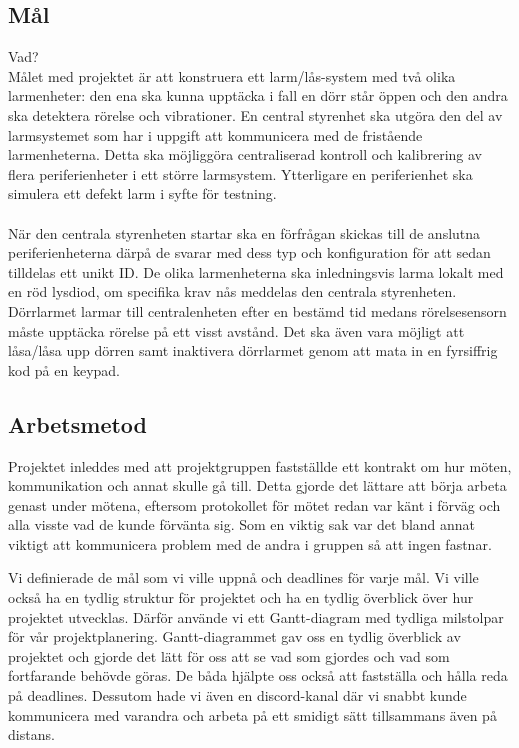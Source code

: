 \documentclass{article}
\begin{document}
\subsection{Mål}
Vad?
\\
Målet med projektet är att konstruera ett larm/lås-system med två olika larmenheter: 
den ena ska kunna upptäcka i fall en dörr står öppen och den andra ska detektera rörelse och vibrationer. 
En central styrenhet ska utgöra den del av larmsystemet som har i uppgift att kommunicera med de fristående larmenheterna. 
Detta ska möjliggöra centraliserad kontroll och kalibrering av flera periferienheter i ett större larmsystem. 
Ytterligare en periferienhet ska simulera ett defekt larm i syfte för testning.
\\\\
När den centrala styrenheten startar ska en förfrågan skickas till de anslutna periferienheterna därpå de svarar med dess typ och konfiguration för att sedan tilldelas ett unikt ID. De olika larmenheterna ska inledningsvis larma lokalt med en röd lysdiod, om specifika krav nås meddelas den centrala styrenheten. Dörrlarmet larmar till centralenheten efter en bestämd tid medans rörelsesensorn måste upptäcka rörelse på ett visst avstånd. Det ska även vara möjligt att låsa/låsa upp dörren samt inaktivera dörrlarmet genom att mata in en fyrsiffrig kod på en keypad.


\subsection{Arbetsmetod}
Projektet inleddes med att projektgruppen fastställde ett kontrakt om hur möten, kommunikation och annat skulle gå till. Detta gjorde det lättare att börja arbeta genast under mötena, eftersom protokollet för mötet redan var känt i förväg och alla visste vad de kunde förvänta sig. Som en viktig sak var det bland annat viktigt att kommunicera problem med de andra i gruppen så att ingen fastnar.

Vi definierade de mål som vi ville uppnå och deadlines för varje mål. Vi ville också ha en tydlig struktur för projektet och ha en tydlig överblick över hur projektet utvecklas. Därför använde vi ett Gantt-diagram med tydliga milstolpar för vår projektplanering. Gantt-diagrammet gav oss en tydlig överblick av projektet och gjorde det lätt för oss att se vad som gjordes och vad som fortfarande behövde göras. De båda hjälpte oss också att fastställa och hålla reda på deadlines. Dessutom hade vi även en discord-kanal där vi snabbt kunde kommunicera med varandra och arbeta på ett smidigt sätt tillsammans även på distans.
\end{document}

